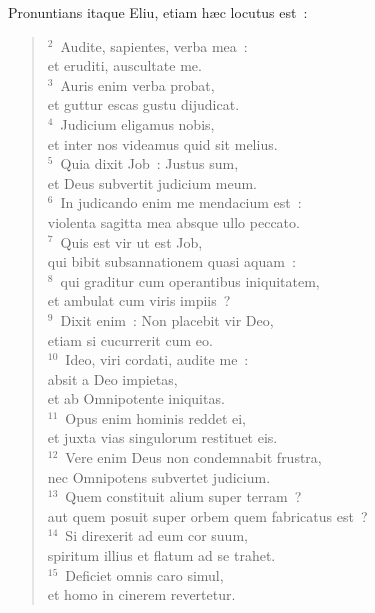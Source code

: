 \lettrine[lines=3,image=true,loversize=0.05,lraise=-0.03]{P}{}ronuntians itaque Eliu, etiam h\ae c locutus est~:
\begin{flushleft}\begin{verse}\vspace{6pt}${}^{2}$~Audite, sapientes, verba mea~:\\ et eruditi, auscultate me.\\
${}^{3}$~Auris enim verba probat,\\ et guttur escas gustu dijudicat.\\
${}^{4}$~Judicium eligamus nobis,\\ et inter nos videamus quid sit melius.\\
${}^{5}$~Quia dixit Job~: Justus sum,\\ et Deus subvertit judicium meum.\\
${}^{6}$~In judicando enim me mendacium est~:\\ violenta sagitta mea absque ullo peccato.\\
${}^{7}$~Quis est vir ut est Job,\\ qui bibit subsannationem quasi aquam~:\\
${}^{8}$~qui graditur cum operantibus iniquitatem,\\ et ambulat cum viris impiis~?\\
${}^{9}$~Dixit enim~: Non placebit vir Deo,\\ etiam si cucurrerit cum eo.\\
${}^{10}$~Ideo, viri cordati, audite me~:\\ absit a Deo impietas,\\ et ab Omnipotente iniquitas.\\
${}^{11}$~Opus enim hominis reddet ei,\\ et juxta vias singulorum restituet eis.\\
${}^{12}$~Vere enim Deus non condemnabit frustra,\\ nec Omnipotens subvertet judicium.\\
${}^{13}$~Quem constituit alium super terram~?\\ aut quem posuit super orbem quem fabricatus est~?\\
${}^{14}$~Si direxerit ad eum cor suum,\\ spiritum illius et flatum ad se trahet.\\
${}^{15}$~Deficiet omnis caro simul,\\ et homo in cinerem revertetur.\\

\end{verse}
\end{flushleft}
